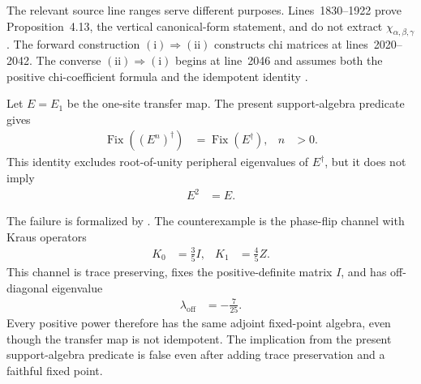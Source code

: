 \documentclass{article}
\begin{document}
The relevant source line ranges serve different purposes. Lines~1830--1922
prove Proposition~4.13, the vertical canonical-form statement, and do not
extract $\chi_{\alpha,\beta,\gamma}$. The forward construction
$(\mathrm{i})\Rightarrow(\mathrm{ii})$ constructs chi matrices at
lines~2020--2042. The converse
$(\mathrm{ii})\Rightarrow(\mathrm{i})$ begins at line~2046 and assumes both
the positive chi-coefficient formula and the idempotent identity
\cite{Cirac2016MPDO_arXiv}.

Let $E=E_1$ be the one-site transfer map. The present support-algebra
predicate gives
\begin{align}
    \operatorname{Fix}\!\left((E^n)^\dagger\right)
        &= \operatorname{Fix}(E^\dagger),
&
    n &> 0.
\label{eq:cpgsv17_blocked_chi_uniformity_fixed_point_tower}
\end{align}
This identity excludes root-of-unity peripheral eigenvalues of $E^\dagger$,
but it does not imply
\begin{align}
    E^2 &= E.
\label{eq:cpgsv17_blocked_chi_uniformity_transfer_idempotence}
\end{align}

The failure is formalized by
.
The counterexample is the phase-flip channel with Kraus operators
\begin{align}
    K_0 &= \frac35 I,
&
    K_1 &= \frac45 Z.
\label{eq:cpgsv17_blocked_chi_uniformity_phase_flip_kraus}
\end{align}
This channel is trace preserving, fixes the positive-definite matrix $I$, and
has off-diagonal eigenvalue
\begin{align}
    \lambda_{\mathrm{off}}
        &= -\frac7{25}.
\label{eq:cpgsv17_blocked_chi_uniformity_phase_flip_eigenvalue}
\end{align}
Every positive power therefore has the same adjoint fixed-point algebra, even
though the transfer map is not idempotent. The implication from the present
support-algebra predicate is false even after adding trace preservation and a
faithful fixed point.
\end{document}
